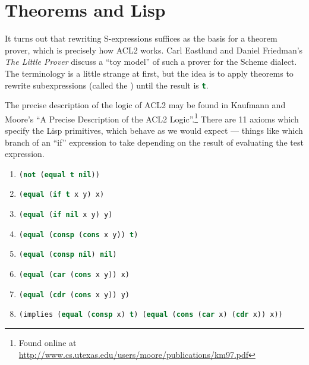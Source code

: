 \chapter{Theorems and Lisp}

\M
It turns out that rewriting S-expressions suffices as the basis for a
theorem prover, which is precisely how ACL2 works. Carl Eastlund and
Daniel Friedman's \textit{The Little Prover} discuss a ``toy model'' of
such a prover for the Scheme dialect. The terminology is a little
strange at first, but the idea is to apply theorems to rewrite
subexpressions (called the ) until the result is
\lstinline[language=lisp]{t}. 

\M The precise description of the logic of ACL2 may be found in Kaufmann
and Moore's ``A Precise Description of the ACL2 Logic''.\footnote{Found online at \url{http://www.cs.utexas.edu/users/moore/publications/km97.pdf}}
There are 11 axioms which specify the Lisp primitives, which behave as
we would expect --- things like which branch of an ``if'' expression to
take depending on the result of evaluating the test expression.

\begin{enumerate}
\item \lstinline[language=lisp]{(not (equal t nil))}
\item \lstinline[language=lisp]{(equal (if t x y) x)}
\item \lstinline[language=lisp]{(equal (if nil x y) y)}
\item \lstinline[language=lisp]{(equal (consp (cons x y)) t)}
\item \lstinline[language=lisp]{(equal (consp nil) nil)}
\item \lstinline[language=lisp]{(equal (car (cons x y)) x)}
\item \lstinline[language=lisp]{(equal (cdr (cons x y)) y)}
\item \lstinline[language=lisp]{(implies (equal (consp x) t) (equal (cons (car x) (cdr x)) x))}
\end{enumerate}

